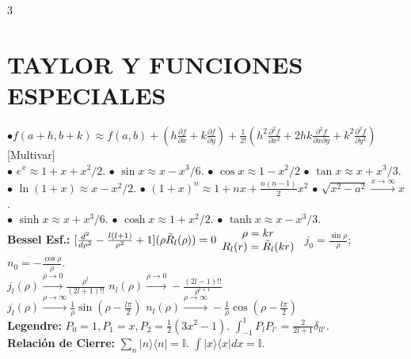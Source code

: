 \documentclass[8pt,a4paper,fleqn]{extarticle} %
\begin{document}
\begin{multicols}{3}
\section{TAYLOR Y FUNCIONES ESPECIALES}
$\bullet f(a+h, b+k) \approx f(a, b) + \left( h \frac{\partial f}{\partial x} + k \frac{\partial f}{\partial y} \right) + \frac{1}{2!} \left( h^2 \frac{\partial^2 f}{\partial x^2} + 2hk \frac{\partial^2 f}{\partial x \partial y} + k^2 \frac{\partial^2 f}{\partial y^2} \right)$ [Multivar]\\
$\bullet$ $e^x \approx 1 + x + x^2/2$.  $\bullet$ $\sin x \approx x - x^3/6$. $\bullet$ $\cos x \approx 1- x^2/2$  $\bullet$ $\tan x \approx x + x^3/3$.\\
$\bullet$ $\ln(1+x) \approx x - x^2/2$. $\bullet$ $(1+x)^n \approx 1 + nx + \frac{n(n-1)}{2}x^2$ $\bullet$ $\sqrt{x^2-a^2}\xrightarrow{x\xrightarrow{}\infty}  x$.\\
$\bullet$ $\sinh x \approx x + x^3/6$. $\bullet$ $\cosh x \approx 1 + x^2/2$. $\bullet$ $\tanh x \approx x - x^3/3$.\\
\textbf{Bessel Esf.:} $[\frac{d^2}{d\rho^2} - \frac{l(l+1)}{\rho^2}+1] (\rho \tilde{R}_l (\rho)) = 0 \hspace{-10pt} \begin{array}{cc}
     & \rho = kr \\
     &  R_l (r)=\tilde{R}_l(kr)
\end{array} 
$ $j_0 = \frac{\sin\rho}{\rho}$; $n_0 = -\frac{\cos\rho}{\rho}$. \\
$j_l(\rho) \xrightarrow{\rho \to 0} \frac{\rho^l}{(2l+1)!!}$ $n_l(\rho) \xrightarrow{\rho \to 0} -\frac{(2l-1)!!}{\rho^{l+1}}$ \;\;\\ $j_l(\rho) \xrightarrow{\rho \to \infty} \frac{1}{\rho} \sin\left(\rho - \frac{l\pi}{2}\right)$
$n_l(\rho) \xrightarrow{\rho \to \infty} -\frac{1}{\rho} \cos\left(\rho - \frac{l\pi}{2}\right)$ \\
\textbf{Legendre:} $P_0=1, P_1=x, P_2=\frac{1}{2}(3x^2-1)$. $\int_{-1}^1 P_l P_{l'} = \frac{2}{2l+1}\delta_{ll'}$.\\
\textbf{Relación de Cierre:} $\sum_n |n\rangle\langle n| = \mathbb{I}$. $\int |x\rangle\langle x| dx = \mathbb{I}$.



\end{multicols}
\end{document}
